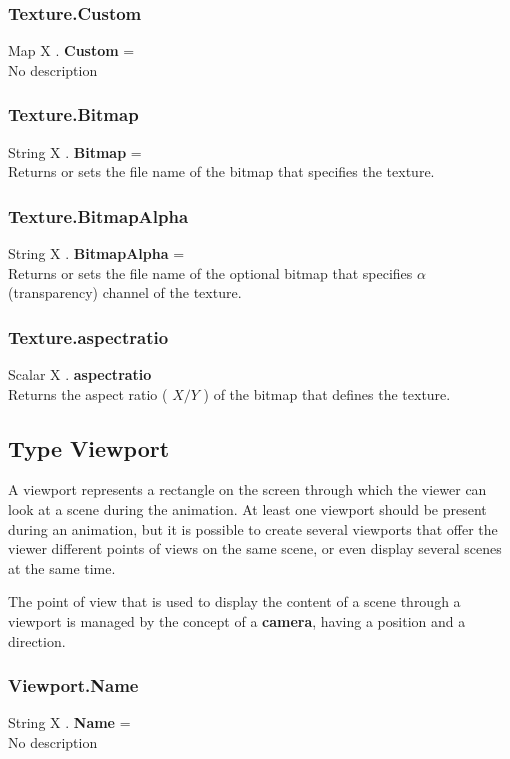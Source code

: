 \documentclass[10pt]{book}
\begin{document}
\subsubsection{Texture.Custom \label{F:Texture:Custom}}
Map X . \textbf{Custom} = \\
No description

\subsubsection{Texture.Bitmap \label{F:Texture:Bitmap}}
String X . \textbf{Bitmap} = \\
Returns or sets the file name of the bitmap that specifies the texture.

\subsubsection{Texture.BitmapAlpha \label{F:Texture:BitmapAlpha}}
String X . \textbf{BitmapAlpha} = \\
Returns or sets the file name of the optional bitmap that specifies $\alpha$ (transparency) channel of the texture.

\subsubsection{Texture.aspectratio \label{F:Texture:aspectratio}}
Scalar X . \textbf{aspectratio} \\
Returns the aspect ratio ( $X/Y$ ) of the bitmap that defines the texture.

\subsection{Type Viewport \label{T:Viewport}}
A viewport represents a rectangle on the screen through which the viewer can look at a scene during the animation. At least one viewport should be present during an animation, but it is possible to create several viewports that offer the viewer different points of views on the same scene, or even display several scenes at the same time.

The point of view that is used to display the content of a scene through a viewport is managed by the concept of a \textbf{camera}, having a position and a direction.

\subsubsection{Viewport.Name \label{F:Viewport:Name}}
String X . \textbf{Name} = \\
No description
\end{document}
